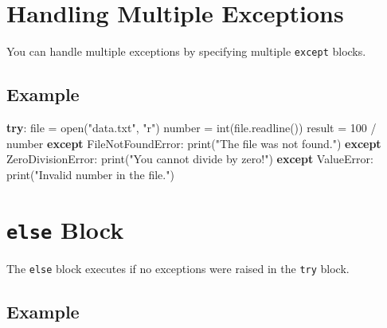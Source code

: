 \documentclass[
  letterpaper,
  DIV=11,
  numbers=noendperiod]{scrreprt}
\newenvironment{Shaded}{\begin{snugshade}}{\end{snugshade}}
\newcommand{\BuiltInTok}[1]{\textcolor[rgb]{0.00,0.23,0.31}{#1}}
\newcommand{\ControlFlowTok}[1]{\textcolor[rgb]{0.00,0.23,0.31}{\textbf{#1}}}
\newcommand{\DecValTok}[1]{\textcolor[rgb]{0.68,0.00,0.00}{#1}}
\newcommand{\NormalTok}[1]{\textcolor[rgb]{0.00,0.23,0.31}{#1}}
\newcommand{\OperatorTok}[1]{\textcolor[rgb]{0.37,0.37,0.37}{#1}}
\newcommand{\PreprocessorTok}[1]{\textcolor[rgb]{0.68,0.00,0.00}{#1}}
\newcommand{\StringTok}[1]{\textcolor[rgb]{0.13,0.47,0.30}{#1}}
\begin{document}
\section{Handling Multiple
Exceptions}\label{handling-multiple-exceptions}

You can handle multiple exceptions by specifying multiple
\texttt{except} blocks.

\subsection{Example}\label{example-1}

\begin{Shaded}
\begin{Highlighting}[]
\ControlFlowTok{try}\NormalTok{:}
    \BuiltInTok{file} \OperatorTok{=} \BuiltInTok{open}\NormalTok{(}\StringTok{"data.txt"}\NormalTok{, }\StringTok{"r"}\NormalTok{)}
\NormalTok{    number }\OperatorTok{=} \BuiltInTok{int}\NormalTok{(}\BuiltInTok{file}\NormalTok{.readline())}
\NormalTok{    result }\OperatorTok{=} \DecValTok{100} \OperatorTok{/}\NormalTok{ number}
\ControlFlowTok{except} \PreprocessorTok{FileNotFoundError}\NormalTok{:}
    \BuiltInTok{print}\NormalTok{(}\StringTok{"The file was not found."}\NormalTok{)}
\ControlFlowTok{except} \PreprocessorTok{ZeroDivisionError}\NormalTok{:}
    \BuiltInTok{print}\NormalTok{(}\StringTok{"You cannot divide by zero!"}\NormalTok{)}
\ControlFlowTok{except} \PreprocessorTok{ValueError}\NormalTok{:}
    \BuiltInTok{print}\NormalTok{(}\StringTok{"Invalid number in the file."}\NormalTok{)}
\end{Highlighting}
\end{Shaded}

\section{\texorpdfstring{\texttt{else}
Block}{else Block}}\label{else-block}

The \texttt{else} block executes if no exceptions were raised in the
\texttt{try} block.

\subsection{Example}\label{example-2}
\end{document}
